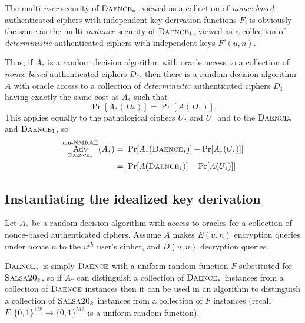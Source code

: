 \documentclass{article}
\def\operatorsc#1{{%
  \ifmmode\let\next=\operatorname\else\let\next=\relax\fi\next{\textsc{#1}}}}
\def\Salsa#1/{\operatorsc{Salsa#1}}
\def\DAENCE/{\operatorsc{Daence}}
\def\muNMRAE{%
  \ifmmode\def\next{\operatorname{mu-NMRAE}}%
    \else\def\next/{mu-\textsc{nmrae}}%
  \fi\next}
\DeclareMathOperator{\Adv}{Adv}
\begin{document}
The multi-\emph{user} security of $\DAENCE/_*$, viewed as a collection
 of \emph{nonce-based} authenticated ciphers with independent key
 derivation functions $F$, is obviously the same as the
 multi-\emph{instance} security of $\DAENCE/_1$, viewed as a
 collection of \emph{deterministic} authenticated ciphers with
 independent keys $F'(u,n)$.

Thus, if $A_*$ is a random decision algorithm with oracle access to a
 collection of \emph{nonce-based} authenticated ciphers $D_*$, then
 there is a random decision algorithm $A$ with oracle access to a
 collection of \emph{deterministic} authenticated ciphers $D_1$ having
 exactly the same cost as $A_*$ such that
\[
  \Pr[A_*(D_*)] = \Pr[A(D_1)].
\]
This applies equally to the pathological ciphers $U_*$ and $U_1$ and
 to the $\DAENCE/_*$ and $\DAENCE/_1$, so
%
\begin{align*}
  \Adv^{\muNMRAE}_{\DAENCE/_*}(A_*)
  &= \lvert\Pr[A_*(\DAENCE/_*)] - \Pr[A_*(U_*)]\rvert \\
  &= \lvert\Pr[A(\DAENCE/_1)] - \Pr[A(U_1)]\rvert.
\end{align*}

\subsection{Instantiating the idealized key derivation}

Let $A_*$ be a random decision algorithm with access to oracles for a
 collection of nonce-based authenticated ciphers.
Assume $A$ makes $E(u,n)$ encryption queries under nonce $n$ to the
 $u^{\mathit{th}}$ user's cipher, and $D(u,n)$ decryption queries.

$\DAENCE/_*$ is simply $\DAENCE/$ with a uniform random function $F$
 substituted for $\Salsa20/_k$, so if $A_*$ can distinguish a
 collection of $\DAENCE/_*$ instances from a collection of $\DAENCE/$
 instances then it can be used in an algorithm to distinguish a
 collection of $\Salsa20/_k$ instances from a collection of $F$
 instances (recall $F\colon \{0,1\}^{128} \to \{0,1\}^{512}$ is a
 uniform random function).
\end{document}
